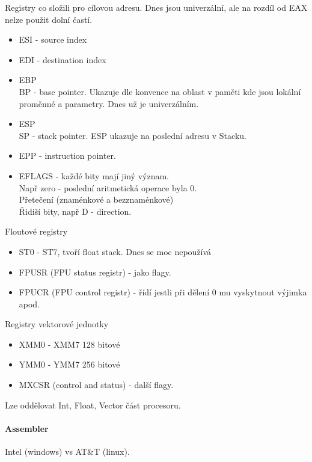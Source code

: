 Registry co složili pro cílovou adresu.
Dnes jsou univerzální, ale na rozdíl od EAX nelze použit dolní častí.
\begin{itemize}
	\item ESI - source index
	\item EDI - destination index
\end{itemize}

\begin{itemize}
	\item EBP\\
		BP - base pointer. Ukazuje dle konvence na oblast v paměti kde jsou lokální proměnné a parametry. Dnes už je univerzálním.
	\item ESP\\
		SP - stack pointer. ESP ukazuje na poslední adresu v Stacku.
	\item EPP - instruction pointer.
	\item EFLAGS - každé bity mají jiný význam.\\
		Např zero - poslední aritmetická operace byla 0.\\
		Přetečení (znaménkové a bezznaménkové)\\
		Řidiší bity, např D - direction.\\
\end{itemize}

Floutové registry
\begin{itemize}
	\item ST0 - ST7, tvoří float stack. Dnes se moc nepoužívá
	\item FPUSR (FPU status registr) - jako flagy.
	\item FPUCR (FPU control registr) - řídí jestli při dělení 0 mu vyskytnout výjimka apod.
\end{itemize}

Registry vektorové jednotky
\begin{itemize}
	\item XMM0 - XMM7 128 bitové
	\item YMM0 - YMM7 256 bitové
	\item MXCSR (control and status) - další flagy.
\end{itemize}

\begin{note}
	Lze oddělovat Int, Float, Vector část procesoru.
\end{note}

\paragraph{Assembler}
Intel (windows) vs AT\&T (linux).

